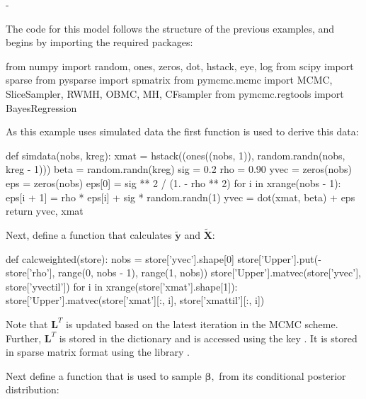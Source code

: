-\documentclass[article]{jss}
\begin{document}
The code for this model follows the structure of the previous
examples, and begins by importing the required packages:




\begin{Code}
from numpy import random, ones, zeros, dot, hstack, eye, log
from scipy import sparse
from pysparse import spmatrix
from pymcmc.mcmc import MCMC, SliceSampler, RWMH, OBMC, MH, CFsampler
from pymcmc.regtools import BayesRegression 
\end{Code}

As this example uses simulated data the first function is used to
derive this data:

\begin{Code}
def simdata(nobs, kreg):
    xmat = hstack((ones((nobs, 1)), random.randn(nobs, kreg - 1)))
    beta = random.randn(kreg)
    sig = 0.2
    rho = 0.90
    yvec = zeros(nobs)
    eps = zeros(nobs)
    eps[0] = sig ** 2 / (1. - rho ** 2)
    for i in xrange(nobs - 1):
        eps[i + 1] = rho * eps[i] + sig * random.randn(1)
    yvec = dot(xmat, beta) + eps
    return yvec, xmat
\end{Code}

Next, define a function that calculates $\tilde{\bm{y}}$ and
$\bm{\tilde{X}}$:


\begin{Code}
def calcweighted(store):
    nobs = store['yvec'].shape[0]
    store['Upper'].put(-store['rho'], range(0, nobs - 1), range(1, nobs))
    store['Upper'].matvec(store['yvec'], store['yvectil'])
    for i in xrange(store['xmat'].shape[1]):
        store['Upper'].matvec(store['xmat'][:, i], store['xmattil'][:, i])

\end{Code}
 Note that $\bm{L}^{T}$ is updated based on the
latest iteration in the MCMC scheme. Further, $\bm{L}^{T}$ is stored
in the  dictionary  and is accessed using
the key . It is stored in sparse matrix format using the
library .

Next define a function that is used to sample $\bm{\beta},$ from its
conditional posterior distribution:
\end{document}
